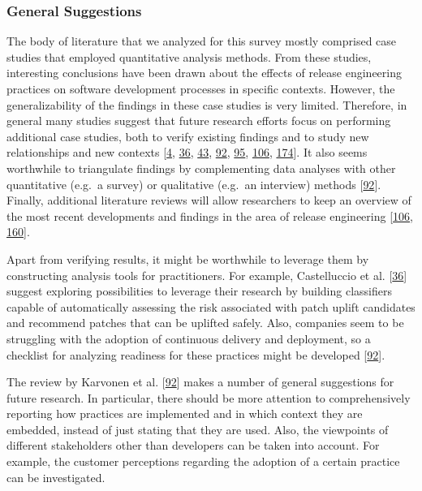\documentclass[]{book}
\begin{document}
\subsubsection{General Suggestions}\label{general-suggestions}

The body of literature that we analyzed for this survey mostly comprised
case studies that employed quantitative analysis methods. From these
studies, interesting conclusions have been drawn about the effects of
release engineering practices on software development processes in
specific contexts. However, the generalizability of the findings in
these case studies is very limited. Therefore, in general many studies
suggest that future research efforts focus on performing additional case
studies, both to verify existing findings and to study new relationships
and new contexts {[}\protect\hyperlink{ref-adams2016a}{4},
\protect\hyperlink{ref-castelluccio2017a}{36},
\protect\hyperlink{ref-claes2017a}{43},
\protect\hyperlink{ref-karvonen2017a}{92},
\protect\hyperlink{ref-khomh2015a}{95},
\protect\hyperlink{ref-laukkanen2018a}{106},
\protect\hyperlink{ref-teixeira2017a}{174}{]}. It also seems worthwhile
to triangulate findings by complementing data analyses with other
quantitative (e.g.~a survey) or qualitative (e.g.~an interview) methods
{[}\protect\hyperlink{ref-karvonen2017a}{92}{]}. Finally, additional
literature reviews will allow researchers to keep an overview of the
most recent developments and findings in the area of release engineering
{[}\protect\hyperlink{ref-laukkanen2018a}{106},
\protect\hyperlink{ref-rodriguez2017a}{160}{]}.

Apart from verifying results, it might be worthwhile to leverage them by
constructing analysis tools for practitioners. For example, Castelluccio
et al. {[}\protect\hyperlink{ref-castelluccio2017a}{36}{]} suggest
exploring possibilities to leverage their research by building
classifiers capable of automatically assessing the risk associated with
patch uplift candidates and recommend patches that can be uplifted
safely. Also, companies seem to be struggling with the adoption of
continuous delivery and deployment, so a checklist for analyzing
readiness for these practices might be developed
{[}\protect\hyperlink{ref-karvonen2017a}{92}{]}.

The review by Karvonen et al.
{[}\protect\hyperlink{ref-karvonen2017a}{92}{]} makes a number of
general suggestions for future research. In particular, there should be
more attention to comprehensively reporting how practices are
implemented and in which context they are embedded, instead of just
stating that they are used. Also, the viewpoints of different
stakeholders other than developers can be taken into account. For
example, the customer perceptions regarding the adoption of a certain
practice can be investigated.
\end{document}
